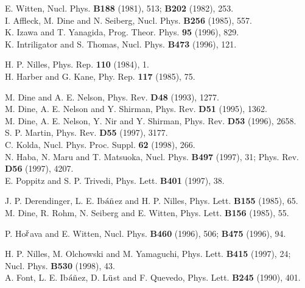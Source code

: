 
\begin{thebibliography}{99}
E. Witten, Nucl. Phys. {\bf B188} (1981), 513; 
                              {\bf B202} (1982), 253. \\
I. Affleck, M. Dine and N. Seiberg, 
                   Nucl. Phys. {\bf B256} (1985), 557. \\
K. Izawa and T. Yanagida, Prog. Theor. Phys. {\bf 95} (1996), 829. \\
K. Intriligator and S. Thomas, Nucl. Phys. {\bf B473} (1996), 121. 

H. P. Nilles, Phys. Rep. {\bf 110} (1984), 1. \\
H. Harber and G. Kane, Phy. Rep. {\bf 117} (1985), 75. 

M. Dine and A. E. Nelson, Phys. Rev. {\bf D48} (1993), 1277. \\
M. Dine, A. E. Nelson and Y. Shirman, 
                          Phys. Rev. {\bf D51} (1995), 1362. \\
M. Dine, A. E. Nelson, Y. Nir and  Y. Shirman, 
                          Phys. Rev. {\bf D53} (1996), 2658. \\
S. P. Martin, Phys. Rev. {\bf D55} (1997), 3177. \\
C. Kolda, Nucl. Phys. Proc. Suppl. {\bf 62} (1998), 266. \\
N. Haba, N. Maru and T. Matsuoka, Nucl. Phys. {\bf B497} (1997), 31; 
                                Phys. Rev. {\bf D56} (1997), 4207. \\
E. Poppitz and S. P. Trivedi, Phys. Lett. {\bf B401} (1997), 38. 


J. P. Derendinger, L. E. Ib$\acute{\rm a}\tilde{\rm n}$ez and 
            H. P. Nilles, Phys. Lett. {\bf B155} (1985), 65. \\
M. Dine, R. Rohm, N. Seiberg and E. Witten, 
            Phys. Lett. {\bf B156} (1985), 55. 

P. Ho$\check{\rm r}$ava and E. Witten, Nucl. Phys. {\bf B460} (1996), 506; 
                                     {\bf B475} (1996), 94. 


H. P. Nilles, M. Olchowski and M. Yamaguchi, 
                 Phys. Lett. {\bf B415} (1997), 24; 
                 Nucl. Phys. {\bf B530} (1998), 43. \\
A. Font, L. E. Ib$\acute{\rm a} \tilde{\rm n}$ez, D. L$\ddot{\rm u}$st 
     and F. Quevedo, Phys. Lett. {\bf B245} (1990), 401. 



\end{thebibliography}

